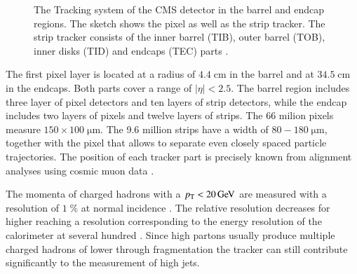 \begin{figure}[htbp!]
  \begin{center}

\caption{The Tracking system of the CMS detector in the barrel and endcap regions. The sketch shows the pixel as well as the strip tracker. The strip tracker consists of the inner barrel (TIB), outer barrel (TOB), inner disks (TID) and endcaps (TEC) parts \cite{Dominguez:1481838}.
  \label{fig:det_Tracker}}
  \end{center}
\end{figure}



The first pixel layer is located at a radius of $4.4 \; \si{\centi \meter}$ in the barrel and at $34.5 \; \si{\centi \meter}$ in the endcaps.
Both parts cover a range of $|\eta| < 2.5$.
The barrel region includes three layer of pixel detectors and ten layers of strip detectors, while the endcap includes two layers of pixels and twelve layers of strips.
The 66 milion pixels measure $150 \times 100 \; \si{\micro \meter}$. The 9.6 million strips have a width of $80-180 \; \si{\micro \meter}$, together with the pixel that allows to separate even closely spaced
particle trajectories.
The position of each tracker part is precisely known from alignment analyses using cosmic muon data \cite{Chatrchyan:2014wfa}.

The momenta of charged hadrons with a $p_{\mathrm{T}} < 20 \,\text{Ge\hspace{-.08em}V}$ are measured with a resolution of $1\; \%$ at normal incidence \cite{Sirunyan:2017ulk}. The relative resolution decreases for higher \pt reaching a resolution corresponding to 
the energy resolution of the calorimeter at several hundred \GeV. Since high \pt partons usually produce multiple charged hadrons of lower \pt through fragmentation the tracker can still contribute significantly 
to the measurement of high \pt jets.

